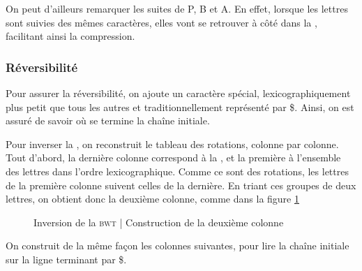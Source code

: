 On peut d'ailleurs remarquer les suites de P, B et A. En effet, lorsque les lettres sont suivies des mêmes caractères, elles vont se retrouver à côté dans la \bwt, facilitant ainsi la compression.

\subsubsection{Réversibilité}
Pour assurer la réversibilité, on ajoute un caractère spécial, lexicographiquement plus petit que tous les autres et traditionnellement représenté par \$. Ainsi, on est assuré de savoir où se termine la chaîne initiale.

Pour inverser la \bwt, on reconstruit le tableau des rotations, colonne par colonne.
Tout d'abord, la dernière colonne correspond à la \bwt, et la première à l'ensemble des lettres dans l'ordre lexicographique. Comme ce sont des rotations, les lettres de la première colonne suivent celles de la dernière. En triant ces groupes de deux lettres, on obtient donc la deuxième colonne, comme dans la figure \ref{unbwt}

\begin{figure}[h!]
\caption{Inversion de la \textsc{bwt} | Construction de la deuxième colonne}
\label{unbwt} 
\end{figure}

On construit de la même façon les colonnes suivantes, pour lire la chaîne initiale sur la ligne terminant par \$.

